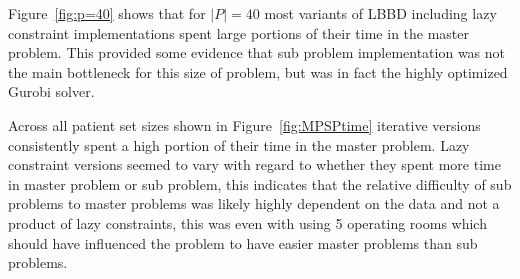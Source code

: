 Figure~\ref{fig:p=40} shows that for $|P|=40$ most variants of LBBD including lazy constraint implementations spent large portions of their time in the master problem. This provided some evidence that sub problem implementation was not the main bottleneck for this size of problem, but was in fact the highly optimized Gurobi solver. 

Across all patient set sizes shown in Figure~\ref{fig:MPSPtime} iterative versions consistently spent a high portion of their time in the master problem. Lazy constraint versions seemed to vary with regard to whether they spent more time in master problem or sub problem, this indicates that the relative difficulty of sub problems to master problems was likely highly dependent on the data and not a product of lazy constraints, this was even with using 5 operating rooms which should have influenced the problem to have easier master problems than sub problems\cite{roshanaei2017propagating}.